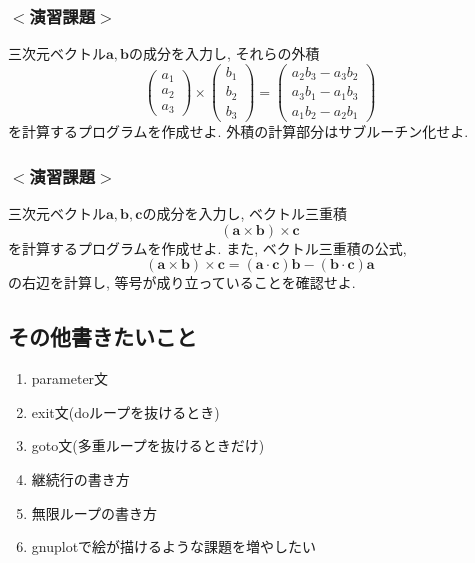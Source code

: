 \documentclass[a4j]{jsarticle}
\begin{document}
\subsubsection*{$<$演習課題$>$}
三次元ベクトル$\bm{a}, \bm{b}$の成分を入力し, それらの外積
\begin{equation}
\begin{pmatrix}
a_1 \\ a_2 \\ a_3
\end{pmatrix}
\times
\begin{pmatrix}
b_1 \\ b_2 \\ b_3
\end{pmatrix}
=
\begin{pmatrix}
a_2b_3-a_3b_2 \\ a_3b_1-a_1b_3 \\ a_1b_2-a_2b_1
\end{pmatrix}
\end{equation}
を計算するプログラムを作成せよ. 
外積の計算部分はサブルーチン化せよ. 
%

\subsubsection*{$<$演習課題$>$}
三次元ベクトル$\bm{a}, \bm{b}, \bm{c}$の成分を入力し, ベクトル三重積
\begin{equation}
(\bm{a} \times \bm{b}) \times \bm{c}
\end{equation}
を計算するプログラムを作成せよ. 
また, ベクトル三重積の公式, 
\begin{equation}
(\bm{a} \times \bm{b}) \times \bm{c} = (\bm{a} \cdot \bm{c})\bm{b} - (\bm{b} \cdot \bm{c})\bm{a}
\end{equation}
の右辺を計算し, 等号が成り立っていることを確認せよ. 
%

%
%
%


\subsection*{その他書きたいこと}
\begin{enumerate}
\item parameter文
\item exit文(doループを抜けるとき)
\item goto文(多重ループを抜けるときだけ)
\item 継続行の書き方
\item 無限ループの書き方
\item gnuplotで絵が描けるような課題を増やしたい
\end{enumerate}
\end{document}
